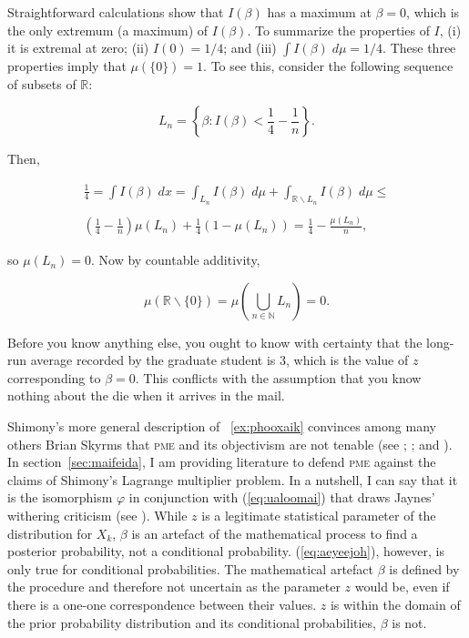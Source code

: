 \documentclass[phd,12pt,oneside]{ubcthesis}
\begin{document}
Straightforward calculations show that $I(\beta)$ has a maximum at
$\beta=0$, which is the only extremum (a maximum) of $I(\beta)$. To
summarize the properties of $I$, (i) it is extremal at zero; (ii)
$I(0)=1/4$; and (iii) $\int{}I(\beta)\;{}d\mu=1/4$. These three properties
imply that $\mu(\{0\})=1$. To see this, consider the following
sequence of subsets of $\mathbb{R}$: 

\begin{equation}
  \label{eq:jeebivod}
  L_{n}=\left\{\beta:I(\beta)<\frac{1}{4}-\frac{1}{n}\right\}.
\end{equation}

{\noindent}Then,

\begin{equation}
  \label{eq:sairejat}
  \begin{array}{l}
    \displaystyle\frac{1}{4}=\int{}I(\beta)\;{}dx=\int_{L_n}I(\beta)\;{}d\mu+\int_{\mathbb{R}\backslash{}L_{n}}I(\beta)\;{}d\mu\leq \\
    \hspace{1cm} \\
    \displaystyle\left(\frac{1}{4}-\frac{1}{n}\right)\mu(L_{n})+\frac{1}{4}(1-\mu(L_{n}))=\frac{1}{4}-\frac{\mu(L_n)}{n},
  \end{array}
\end{equation}

{\noindent}so $\mu(L_{n})=0$. Now by countable additivity,

\begin{equation}
  \label{eq:aesengai}
  \mu(\mathbb{R}\backslash\{0\})=\mu\left(\bigcup_{n\in\mathbb{N}}L_{n}\right)=0.
\end{equation}

Before you know anything else, you ought to know with certainty that
the long-run average recorded by the graduate student is 3, which is
the value of $z$ corresponding to $\beta=0$. This conflicts with the
assumption that you know nothing about the die when it arrives in the
mail.

Shimony's more general description of {\xample}~\ref{ex:phooxaik}
convinces among many others Brian Skyrms that \textsc{pme} and its
objectivism are not tenable (see ;
; and ). In
section~\ref{sec:maifeida}, I am providing literature to defend
\textsc{pme} against the claims of Shimony's Lagrange multiplier
problem. In a nutshell, I can say that it is the isomorphism $\varphi$
in conjunction with (\ref{eq:ualoomai}) that draws Jaynes' withering
criticism (see ). While $z$ is a legitimate
statistical parameter of the distribution for $X_{k}$, $\beta$ is an
artefact of the mathematical process to find a posterior probability,
not a conditional probability. (\ref{eq:aeyeejoh}), however, is only
true for conditional probabilities. The mathematical artefact $\beta$
is defined by the procedure and therefore not uncertain as the
parameter $z$ would be, even if there is a one-one correspondence
between their values. $z$ is within the domain of the prior
probability distribution and its conditional probabilities, $\beta$ is
not.
\end{document}

